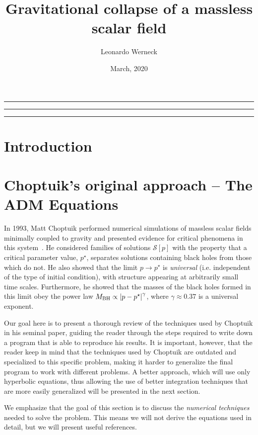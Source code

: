 \documentclass[a4paper,11pt]{article}
\title{Gravitational collapse of a massless scalar field}
\author{Leonardo Werneck}
\date{March, 2020}
\newcommand{\g}{\gamma}
\renewcommand{\S}{\mathcal{S}}
\newcommand{\lrsquare}[1]{\left[ #1 \right]}
\newcommand{\abs}[1]{\left| #1 \right|}
\newcommand{\ctr}[1]{
  \begin{center}
    #1
  \end{center}
}
\begin{document}
\maketitle

\ctr{\rule{\textwidth}{1pt}}
\tableofcontents
\ctr{\rule{\textwidth}{1pt}}
\listoffigures
\ctr{\rule{\textwidth}{1pt}}


\section{Introduction}

\section{Choptuik's original approach -- The ADM Equations}

In 1993, Matt Choptuik performed numerical simulations of massless scalar fields minimally coupled to gravity and presented evidence for critical phenomena in this system~\cite{PhysRevLett.70.9}. He considered families of solutions $\S\lrsquare{p}$ with the property that a critical parameter value, $p^{\star}$, separates solutions containing black holes from those which do not. He also showed that the limit $p\to p^{\star}$ is \emph{universal} (i.e. independent of the type of initial condition), with structure appearing at arbitrarily small time scales. Furthermore, he showed that the masses of the black holes formed in this limit obey the power law $M_{\rm BH} \propto \abs{p-p^{\star}}^{\g}$, where $\g\approx0.37$ is a universal exponent.

Our goal here is to present a thorough review of the techniques used by Choptuik in his seminal paper, guiding the reader through the steps required to write down a program that is able to reproduce his results. It is important, however, that the reader keep in mind that the techniques used by Choptuik are outdated and specialized to this specific problem, making it harder to generalize the final program to work with different problems. A better approach, which will use only hyperbolic equations, thus allowing the use of better integration techniques that are more easily generalized will be presented in the next section.

We emphasize that the goal of this section is to discuss the \emph{numerical techniques} needed to solve the problem. This means we will not derive the equations used in detail, but we will present useful references.
\end{document}
